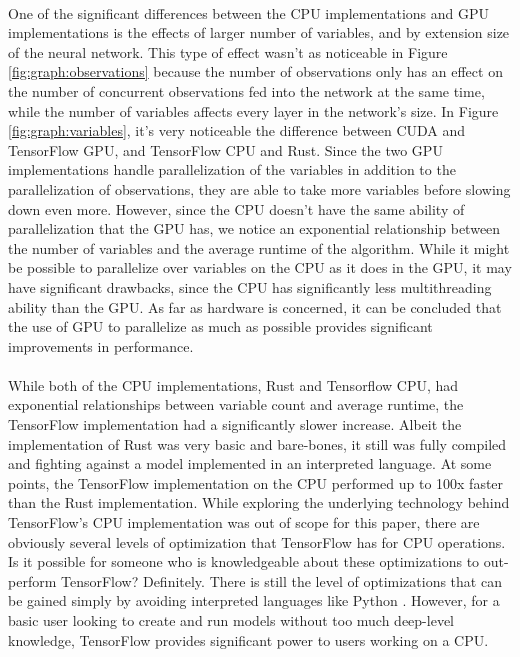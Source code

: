 \documentclass[12pt]{article}
\begin{document}
\paragraph{} %
One of the significant differences between the CPU implementations and GPU implementations is the effects of larger number of variables, and by extension size of the neural network.
This type of effect wasn't as noticeable in Figure \ref{fig:graph:observations} because the number of observations only has an effect on the number of concurrent observations fed into the network at the same time, while the number of variables affects every layer in the network's size.
In Figure \ref{fig:graph:variables}, it's very noticeable the difference between CUDA and TensorFlow GPU, and TensorFlow CPU and Rust.
Since the two GPU implementations handle parallelization of the variables in addition to the parallelization of observations, they are able to take more variables before slowing down even more.
However, since the CPU doesn't have the same ability of parallelization that the GPU has, we notice an exponential relationship between the number of variables and the average runtime of the algorithm.
While it might be possible to parallelize over variables on the CPU as it does in the GPU, it may have significant drawbacks, since the CPU has significantly less multithreading ability than the GPU.
As far as hardware is concerned, it can be concluded that the use of GPU to parallelize as much as possible provides significant improvements in performance.

\paragraph{} %
While both of the CPU implementations, Rust and Tensorflow CPU, had exponential relationships between variable count and average runtime, the TensorFlow implementation had a significantly slower increase.
Albeit the implementation of Rust was very basic and bare-bones, it still was fully compiled and fighting against a model implemented in an interpreted language.
At some points, the TensorFlow implementation on the CPU performed up to 100x faster than the Rust implementation.
While exploring the underlying technology behind TensorFlow's CPU implementation was out of scope for this paper, there are obviously several levels of optimization that TensorFlow has for CPU operations.
Is it possible for someone who is knowledgeable about these optimizations to out-perform TensorFlow? Definitely.
There is still the level of optimizations that can be gained simply by avoiding interpreted languages like Python \cite{article_compiled_interpreted_hybrid_languages}.
However, for a basic user looking to create and run models without too much deep-level knowledge, TensorFlow provides significant power to users working on a CPU.
\end{document}
